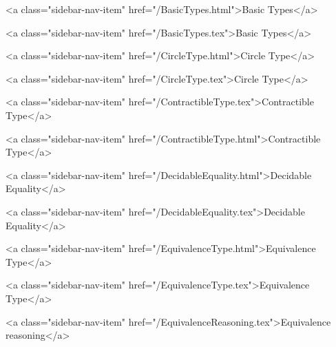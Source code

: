       
        
          <a class="sidebar-nav-item" href="/BasicTypes.html">Basic Types</a>
        
      
    
      
        
          <a class="sidebar-nav-item" href="/BasicTypes.tex">Basic Types</a>
        
      
    
      
        
          <a class="sidebar-nav-item" href="/CircleType.html">Circle Type</a>
        
      
    
      
        
          <a class="sidebar-nav-item" href="/CircleType.tex">Circle Type</a>
        
      
    
      
        
          <a class="sidebar-nav-item" href="/ContractibleType.tex">Contractible Type</a>
        
      
    
      
        
          <a class="sidebar-nav-item" href="/ContractibleType.html">Contractible Type</a>
        
      
    
      
        
          <a class="sidebar-nav-item" href="/DecidableEquality.html">Decidable Equality</a>
        
      
    
      
        
          <a class="sidebar-nav-item" href="/DecidableEquality.tex">Decidable Equality</a>
        
      
    
      
        
          <a class="sidebar-nav-item" href="/EquivalenceType.html">Equivalence Type</a>
        
      
    
      
        
          <a class="sidebar-nav-item" href="/EquivalenceType.tex">Equivalence Type</a>
        
      
    
      
        
          <a class="sidebar-nav-item" href="/EquivalenceReasoning.tex">Equivalence reasoning</a>
        
